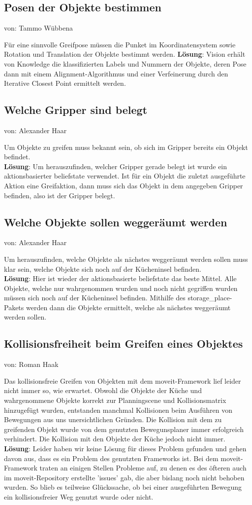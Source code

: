 \documentclass{suturo}
\makeatletter
\newcommand{\chapterauthor}[1]{%
  {\parindent0pt\vspace*{-27pt}%
  \linespread{0}\small\begin{flushright}von: #1\end{flushright}%
  \par\nobreak\vspace*{0pt}}
  \@afterheading%
}
\makeatother
\begin{document}
\subsection{Posen der Objekte bestimmen}
\chapterauthor{Tammo Wübbena}
Für eine sinnvolle Greifpose müssen die Punket im Koordinatensystem sowie Rotation und Translation der Objekte bestimmt werden. 
\textbf{Lösung}: Vision erhält von Knowledge die klassifizierten Labels und Nummern der Objekte, deren Pose dann mit einem Alignment-Algorithmus und einer Verfeinerung durch den Iterative Closest Point ermittelt werden.

\subsection{Welche Gripper sind belegt}
\chapterauthor{Alexander Haar}
Um Objekte zu greifen muss bekannt sein, ob sich im Gripper bereits ein Objekt befindet.\\
\textbf{Lösung}: Um herauszufinden, welcher Gripper gerade belegt ist wurde ein aktionsbasierter beliefstate verwendet. Ist für ein Objekt die zuletzt ausgeführte Aktion eine Greifaktion, dann muss sich das Objekt in dem angegeben Gripper befinden, also ist der Gripper belegt.

\subsection{Welche Objekte sollen weggeräumt werden}
\chapterauthor{Alexander Haar} 
Um herauszufinden, welche Objekte als nächstes weggeräumt werden sollen muss klar sein, welche Objekte sich noch auf der Kücheninsel befinden.\\
\textbf{Lösung}: Hier ist wieder der aktionsbasierte beliefstate das beste Mittel. Alle Objekte, welche nur wahrgenommen wurden und noch nicht gegriffen wurden müssen sich noch auf der Kücheninsel befinden. Mithilfe des storage\_place- Pakets werden dann die Objekte ermittelt, welche als nächstes weggeräumt werden sollen.

\subsection{Kollisionsfreiheit beim Greifen eines Objektes}
\chapterauthor{Roman Haak}
Das kollisionsfreie Greifen von Objekten mit dem moveit-Framework lief leider nicht immer so, wie erwartet. Obwohl die Objekte der Küche und wahrgenommene Objekte korrekt zur Planningscene und Kollisionsmatrix hinzugefügt wurden, entstanden manchmal Kollisionen beim Ausführen von Bewegungen aus uns unersichtlichen Gründen. Die Kollision mit dem zu greifenden Objekt wurde von dem genutzten Bewegunsplaner immer erfolgreich verhindert. Die Kollision mit den Objekte der Küche jedoch nicht immer.\\
\textbf{Lösung}: Leider haben wir keine Lösung für dieses Problem gefunden und gehen davon aus, dass es ein Problem des genutzten Frameworks ist. Bei dem moveit-Framework traten an einigen Stellen Probleme auf, zu denen es des öfteren auch im moveit-Repository erstellte 'issues' gab, die aber bislang noch nicht behoben wurden. So blieb es teilweise Glückssache, ob bei einer ausgeführten Bewegung ein kollisionsfreier Weg genutzt wurde oder nicht.
\end{document}
